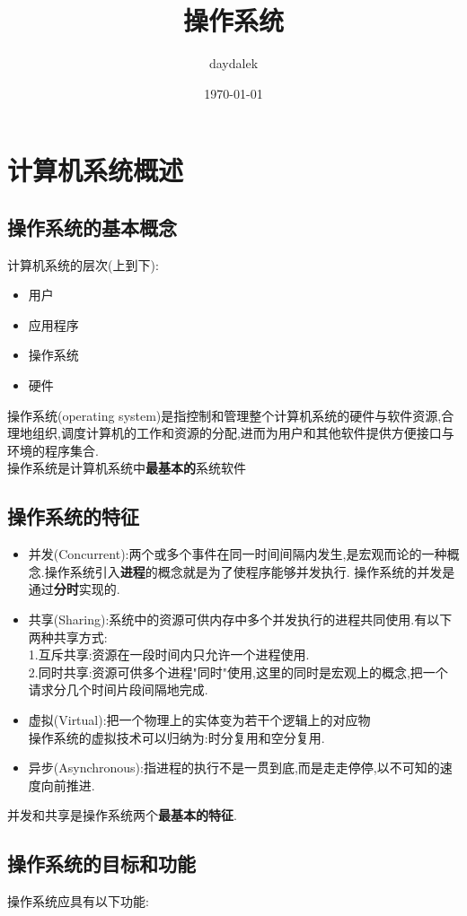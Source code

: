 \documentclass{ctexart}
\begin{document}
\title{操作系统}
\author{daydalek}
\date{\today}
\maketitle

\section{计算机系统概述}
\subsection{操作系统的基本概念}
计算机系统的层次(上到下):
\begin{itemize}
    \item 用户
    \item 应用程序
    \item 操作系统
    \item 硬件
\end {itemize}
操作系统(operating system)是指控制和管理整个计算机系统的硬件与软件资源,合理地组织,调度计算机的工作和资源的分配,进而为用户和其他软件提供方便接口与环境的程序集合.\\
操作系统是计算机系统中\textbf{最基本的}系统软件
\subsection{操作系统的特征}
\begin{itemize}
    \item 并发(Concurrent):两个或多个事件在同一时间间隔内发生,是宏观而论的一种概念.操作系统引入\textbf{进程}的概念就是为了使程序能够并发执行.
    操作系统的并发是通过\textbf{分时}实现的.
    \item 共享(Sharing):系统中的资源可供内存中多个并发执行的进程共同使用.有以下两种共享方式:\\
    1.互斥共享:资源在一段时间内只允许一个进程使用.\\
    2.同时共享:资源可供多个进程"同时"使用,这里的同时是宏观上的概念,把一个请求分几个时间片段间隔地完成.
    \item 虚拟(Virtual):把一个物理上的实体变为若干个逻辑上的对应物\\
    操作系统的虚拟技术可以归纳为:时分复用和空分复用.
    \item 异步(Asynchronous):指进程的执行不是一贯到底,而是走走停停,以不可知的速度向前推进.
\end{itemize}
并发和共享是操作系统两个\textbf{最基本的特征}.
\subsection{操作系统的目标和功能}
操作系统应具有以下功能:
\end{document}
